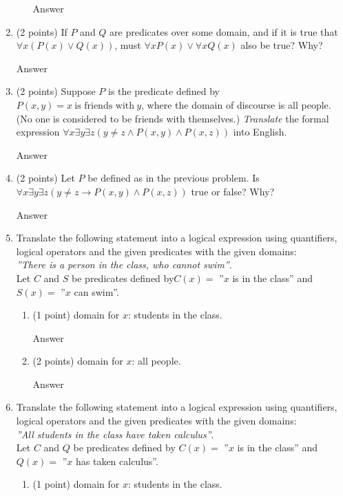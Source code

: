 \documentclass{article}
\begin{document}
\begin{enumerate}
\begin{enumerate}
            \color{blue}
                Answer
            \color{black}
        \end{enumerate}
        
    \item (2 points) If $P$ and $Q$ are predicates over some domain, and if it is true that $\forall x(P (x) \vee Q(x))$, must $\forall xP (x) \vee \forall xQ(x)$ also be true? Why?
    
    \color{blue}
        Answer
    \color{black}
    
    \item (2 points) Suppose $P$ is the predicate defined by $P(x, y) = x\ \text{is friends with}\ y$, where the domain of discourse is all people. (No one is considered to be friends with themselves.) \textit{Translate} the formal expression $\forall x\exists y\exists z(y \neq z \wedge P(x, y) \wedge P(x, z))$ into English.
    
    \color{blue}
        Answer
    \color{black}
    
    \item (2 points) Let $P$ be defined as in the previous problem. Is $\forall x\exists y\exists z(y \neq z \rightarrow P(x, y) \wedge P(x, z))$ true or false? Why? 
    
    \color{blue}
        Answer
    \color{black}
    
    \item Translate the following statement into a logical expression using quantifiers, logical operators and the given predicates with the given domains: 
    \\\textit{”There is a person in the class, who cannot swim”}.
    \\Let $C$ and $S$ be predicates defined by$ C(x) =$ ”$x$ is in the class” and $S(x) =$ ”$x$ can swim”.
    \begin{enumerate}
        \item (1 point) domain for $x$: students in the class.
    
        \color{blue}
            Answer
        \color{black}
        
        \item (2 points) domain for $x$: all people.
    
        \color{blue}
            Answer
        \color{black}
    \end{enumerate}
    
    \item Translate the following statement into a logical expression using quantifiers, logical operators and the given predicates with the given domains:
    \\\textit{”All students in the class have taken calculus”}.
    \\Let $C$ and $Q$ be predicates defined by $C(x) =$ ”$x$ is in the class” and
    $Q(x) =$ ”$x$ has taken calculus”.
    \begin{enumerate}
        \item (1 point) domain for $x$: students in the class.
    

\end{enumerate}
\end{enumerate}
\end{document}
